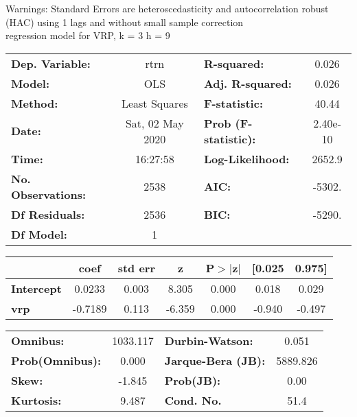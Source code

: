 Warnings: \newline
 [1] Standard Errors are heteroscedasticity and autocorrelation robust (HAC) using 1 lags and without small sample correction\\ 

regression model for VRP, k = 3 h = 9\begin{center}
\begin{tabular}{lclc}
\toprule
\textbf{Dep. Variable:}    &       rtrn       & \textbf{  R-squared:         } &     0.026   \\
\textbf{Model:}            &       OLS        & \textbf{  Adj. R-squared:    } &     0.026   \\
\textbf{Method:}           &  Least Squares   & \textbf{  F-statistic:       } &     40.44   \\
\textbf{Date:}             & Sat, 02 May 2020 & \textbf{  Prob (F-statistic):} &  2.40e-10   \\
\textbf{Time:}             &     16:27:58     & \textbf{  Log-Likelihood:    } &    2652.9   \\
\textbf{No. Observations:} &        2538      & \textbf{  AIC:               } &    -5302.   \\
\textbf{Df Residuals:}     &        2536      & \textbf{  BIC:               } &    -5290.   \\
\textbf{Df Model:}         &           1      & \textbf{                     } &             \\
\bottomrule
\end{tabular}
\begin{tabular}{lcccccc}
                   & \textbf{coef} & \textbf{std err} & \textbf{z} & \textbf{P$> |$z$|$} & \textbf{[0.025} & \textbf{0.975]}  \\
\midrule
\textbf{Intercept} &       0.0233  &        0.003     &     8.305  &         0.000        &        0.018    &        0.029     \\
\textbf{vrp}       &      -0.7189  &        0.113     &    -6.359  &         0.000        &       -0.940    &       -0.497     \\
\bottomrule
\end{tabular}
\begin{tabular}{lclc}
\textbf{Omnibus:}       & 1033.117 & \textbf{  Durbin-Watson:     } &    0.051  \\
\textbf{Prob(Omnibus):} &   0.000  & \textbf{  Jarque-Bera (JB):  } & 5889.826  \\
\textbf{Skew:}          &  -1.845  & \textbf{  Prob(JB):          } &     0.00  \\
\textbf{Kurtosis:}      &   9.487  & \textbf{  Cond. No.          } &     51.4  \\
\bottomrule
\end{tabular}
\end{center}

